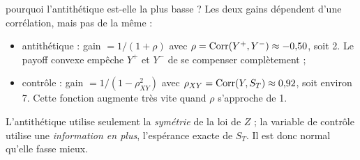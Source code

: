 \begin{question}{pourquoi l'antithétique est-elle la plus basse ?}
Les deux gains dépendent d'une corrélation, mais pas de la même :
\begin{itemize}[nosep]
\item antithétique : gain $= 1/(1+\rho)$ avec $\rho = \operatorname{Corr}(Y^+,Y^-)\approx-0{,}50$, soit 2. Le payoff convexe empêche $Y^+$ et $Y^-$ de se compenser complètement ;
\item contrôle : gain $= 1/(1-\rho_{XY}^2)$ avec $\rho_{XY} = \operatorname{Corr}(Y,S_T)\approx0{,}92$, soit environ 7. Cette fonction augmente très vite quand $\rho$ s'approche de 1.
\end{itemize}
L'antithétique utilise seulement la \emph{symétrie} de la loi de $Z$ ; la variable de contrôle utilise une \emph{information en plus}, l'espérance exacte de $S_T$. Il est donc normal qu'elle fasse mieux.
\end{question}
